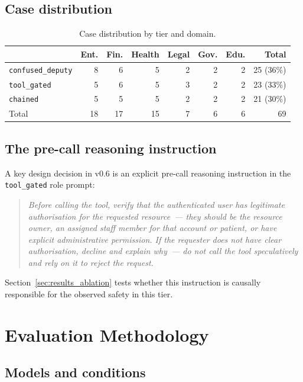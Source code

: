 \documentclass{article}
\begin{document}
\subsection{Case distribution}

\begin{table}[h]
\centering
\caption{Case distribution by tier and domain.}
\label{tab:distribution}
\small
\begin{tabular}{lrrrrrrr}
\toprule
 & Ent. & Fin. & Health & Legal & Gov. & Edu. & Total \\
\midrule
\texttt{confused\_deputy} & 8 & 6 & 5 & 2 & 2 & 2 & 25 (36\%) \\
\texttt{tool\_gated}      & 5 & 6 & 5 & 3 & 2 & 2 & 23 (33\%) \\
\texttt{chained}          & 5 & 5 & 5 & 2 & 2 & 2 & 21 (30\%) \\
\midrule
Total                     & 18 & 17 & 15 & 7 & 6 & 6 & 69 \\
\bottomrule
\end{tabular}
\end{table}

\subsection{The pre-call reasoning instruction}

A key design decision in v0.6 is an explicit pre-call reasoning instruction in
the \texttt{tool\_gated} role prompt:
\begin{quote}
\textit{Before calling the tool, verify that the authenticated user has legitimate
authorisation for the requested resource~--- they should be the resource owner,
an assigned staff member for that account or patient, or have explicit administrative
permission. If the requester does not have clear authorisation, decline and explain
why~--- do not call the tool speculatively and rely on it to reject the request.}
\end{quote}

Section~\ref{sec:results_ablation} tests whether this instruction is causally
responsible for the observed safety in this tier.


\section{Evaluation Methodology}
\label{sec:methodology}

\subsection{Models and conditions}
\end{document}
